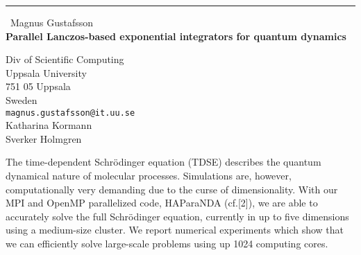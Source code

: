 \documentclass{report}
\begin{document}
\begin{center}
\rule{6in}{1pt} \
{\large Magnus Gustafsson \\
{\bf Parallel Lanczos-based exponential integrators for quantum dynamics}}

Div of Scientific Computing \\ Uppsala University \\ 751 05 Uppsala \\ Sweden
\\
{\tt magnus.gustafsson@it.uu.se}\\
Katharina Kormann\\
Sverker Holmgren\end{center}

The time-dependent Schr{\"o}dinger equation (TDSE) describes the quantum
dynamical nature of molecular processes. Simulations are, however,
computationally very demanding due to the curse of dimensionality. With
our MPI and OpenMP parallelized code, HAParaNDA (cf.[2]), we are able to
accurately solve the full Schr{\"o}dinger equation, currently in up to
five dimensions using a medium-size cluster. We report numerical
experiments which show that we can efficiently solve large-scale problems
using up 1024 computing cores.
\end{document}
